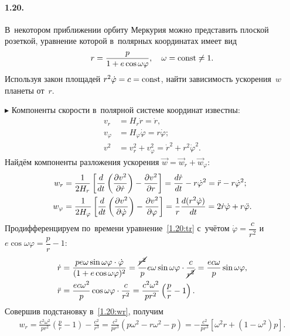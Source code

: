 \documentclass{weekly}
\begin{document}

\paragraph{1.20.} В~некотором приближении орбиту Меркурия
можно представить плоской розеткой, уравнение которой
в~полярных координатах имеет вид
\begin{equation}\label{1.20:tr}
    r = \frac{p}{1+e\cos\omega\varphi}, \quad
    \omega = \mathrm{const} \neq 1.
\end{equation}
Используя закон площадей $r^2 \dot\varphi = c = \mathrm{const}$,
найти зависимость ускорения~$w$ планеты от~$r$.

$\blacktriangleright$ Компоненты скорости
в~полярной системе координат известны:
\begin{align}
    v_r &= H_r \dot r = \dot r, \\
    v_\varphi &= H_\varphi \dot\varphi = r \dot\varphi; \\
    v^2 &= v_r^2 + v_\varphi^2 = \dot r^2 + r^2 \dot\varphi^2.
\end{align}
Найдём компоненты разложения ускорения
$\vec w = \vec w_r + \vec w_\varphi$:
\begin{align}
    w_r &= \frac{1}{2H_r}
            \left[ \frac{d }{d t} \left(\frac{\partial v^2}{\partial \dot r}\right) -
            \frac{\partial v^2}{\partial r} \right]
        = \frac{d \dot r}{d t} - r \dot\varphi^2
        = \ddot r - r\dot\varphi^2; \label{1.20:wr}\\
    w_\varphi &= \frac{1}{2H_\varphi}
            \left[ \frac{d }{d t} \left(\frac{\partial v^2}{\partial \dot\varphi}\right) -
            \frac{\partial v^2}{\partial \varphi} \right]
        = \frac{1}{r} \frac{d (r^2 \dot\varphi)}{d t}
        = 2 \dot r \dot\varphi + r \ddot\varphi. \label{1.20:wphi}
\end{align}
Продифференцируем по~времени уравнение~\eqref{1.20:tr} с~учётом
$\dot\varphi = \dfrac{c}{r^2}$ и
$e \cos\omega\varphi = \dfrac{p}{r} - 1$:
\begin{align}
    \dot r &= \frac{pe\omega \sin\omega\varphi \cdot \dot\varphi}
        {(1+e\cos\omega\varphi)^2}
        = \frac{\cancel{r^2}}{p} e\omega \sin\omega\varphi \cdot
            \frac{c}{\cancel{r^2}}
        = \frac{ec\omega}{p} \sin{\omega\varphi}, \\
    \ddot r &= \frac{ec\omega^2}{p} \cos\omega\varphi \cdot
        \frac{c}{r^2} = \frac{c^2 \omega^2}{pr^2}
        \left( \frac{p}{r} - 1 \right).
\end{align}
Совершив подстановку в~\eqref{1.20:wr}, получим
\begin{align}
    w_r = \frac{c^2 \omega^2}{pr^2} \left(\frac{p}{r}-1\right) -
            \frac{c^2}{r^3}
        = \frac{c^2}{pr^3} \left( p \omega^2 - r \omega^2 - p \right)
        = -\frac{c^2}{pr^3} \left[ \omega^2 r +
            \left( 1-\omega^2 \right) p \right].
\end{align}
\end{document}

